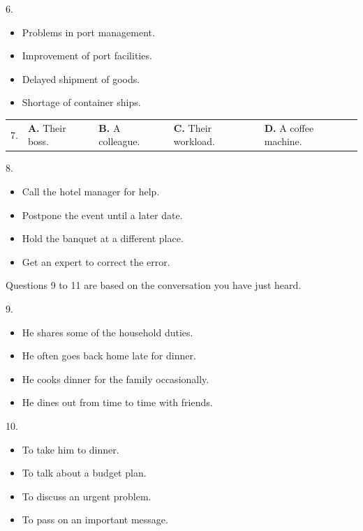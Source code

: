 \documentclass[UTF8,11pt]{ctexart}
\begin{document}
6.


\begin{itemize}[leftmargin=2em,itemsep=.2em,topsep=.4em]\item[A.] Problems in port management.
\item[B.] Improvement of port facilities.
\item[C.] Delayed shipment of goods.
\item[D.] Shortage of container ships.
\end{itemize}

\noindent\begin{tabularx}{\linewidth}{@{}lXXXX@{}}7. & \textbf{A.} Their boss. & \textbf{B.} A colleague. & \textbf{C.} Their workload. & \textbf{D.} A coffee machine.\\\end{tabularx}\par

8.


\begin{itemize}[leftmargin=2em,itemsep=.2em,topsep=.4em]\item[A.] Call the hotel manager for help.
\item[B.] Postpone the event until a later date.
\item[C.] Hold the banquet at a different place.
\item[D.] Get an expert to correct the error.
\end{itemize}

Questions 9 to 11 are based on the conversation you have just heard.


9.


\begin{itemize}[leftmargin=2em,itemsep=.2em,topsep=.4em]\item[A.] He shares some of the household duties.
\item[B.] He often goes back home late for dinner.
\item[C.] He cooks dinner for the family occasionally.
\item[D.] He dines out from time to time with friends.
\end{itemize}

10.


\begin{itemize}[leftmargin=2em,itemsep=.2em,topsep=.4em]\item[A.] To take him to dinner.
\item[B.] To talk about a budget plan.
\item[C.] To discuss an urgent problem.
\item[D.] To pass on an important message.
\end{itemize}
\end{document}
